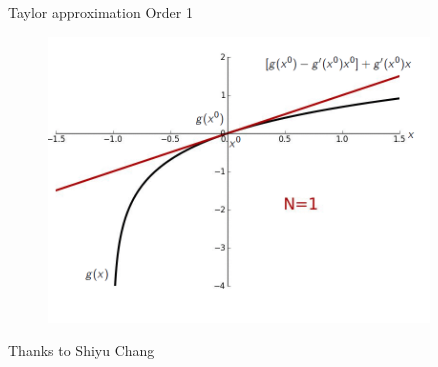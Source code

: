 \documentclass[11pt,table]{beamer}
\begin{document}
\begin{frame}{Taylor approximation Order 1}
\begin{figure}
	\centering
		\includegraphics[width=0.90\textwidth]{figures/taylor1_formula.png}
	\label{fig:taylor1_formula}
\end{figure}
\tiny Thanks to Shiyu Chang
\end{frame}
\end{document}
